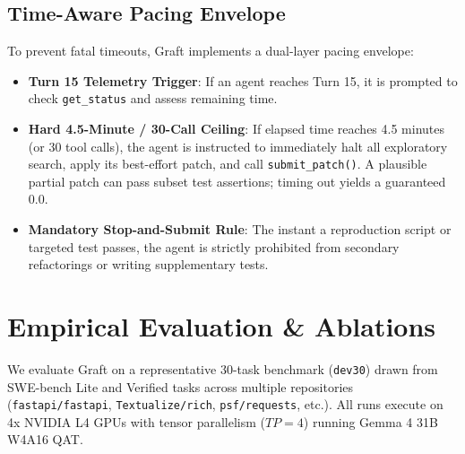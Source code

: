 \documentclass[10pt,twocolumn,letterpaper]{article}
\begin{document}
\subsection{Time-Aware Pacing Envelope}
To prevent fatal timeouts, Graft implements a dual-layer pacing envelope:
\begin{itemize}
    \item \textbf{Turn 15 Telemetry Trigger}: If an agent reaches Turn 15, it is prompted to check \texttt{get\_status} and assess remaining time.
    \item \textbf{Hard 4.5-Minute / 30-Call Ceiling}: If elapsed time reaches 4.5 minutes (or 30 tool calls), the agent is instructed to immediately halt all exploratory search, apply its best-effort patch, and call \texttt{submit\_patch()}. A plausible partial patch can pass subset test assertions; timing out yields a guaranteed 0.0.
    \item \textbf{Mandatory Stop-and-Submit Rule}: The instant a reproduction script or targeted test passes, the agent is strictly prohibited from secondary refactorings or writing supplementary tests.
\end{itemize}

\section{Empirical Evaluation \& Ablations}

We evaluate Graft on a representative 30-task benchmark (\texttt{dev30}) drawn from SWE-bench Lite and Verified tasks across multiple repositories (\texttt{fastapi/fastapi}, \texttt{Textualize/rich}, \texttt{psf/requests}, etc.). All runs execute on 4x NVIDIA L4 GPUs with tensor parallelism ($TP=4$) running Gemma 4 31B W4A16 QAT.

\begin{table}[t]
\centering
\small
\caption{\textbf{Architecture Ablation on SWE-bench Dev30 (30 Tasks, 4x NVIDIA L4 GPUs)}.}
\label{tab:ablation}
\end{table}
\end{document}
